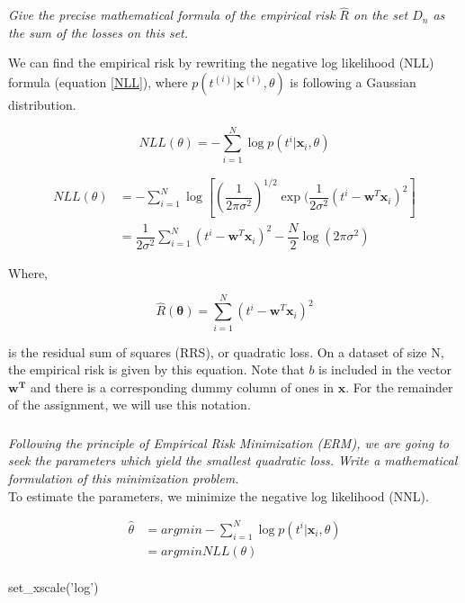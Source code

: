 \documentclass[reqno]{amsart}
\theoremstyle{definition}
\theoremstyle{remark}
\numberwithin{equation}{section}
\begin{document}
\textit{Give the precise mathematical formula of  the empirical risk $\hat{R}$ on the set $D_n$ as the sum of the losses on this set.\\}

We can find the empirical risk by rewriting the negative log likelihood (NLL) formula (equation \ref{NLL}), where $p(t^{(i)}|\mathbf{x}^{(i)}, \theta)$ is following a Gaussian distribution. 

\begin{equation}
\label{NLL}
    NLL(\theta) = -\sum_{i = 1}^{N}\log p(t^{i}|\mathbf{x}_{i}, \theta)
\end{equation}

\begin{align}
    NLL(\theta) &= -\sum_{i = 1}^{N}\log [(\dfrac{1}{2\pi\sigma^2})^{1/2}  \exp(\dfrac{1}{2\sigma^2}(t^{i}-\mathbf{w}^T\mathbf{x}_{i})^2] \\
    &= \dfrac{1}{2\sigma^2} \sum_{i=1}^{N}(t^{i}-\mathbf{w}^{T}\mathbf{x}_{i})^2 - \dfrac{N}{2} \log(2\pi\sigma^2) \label{NLL2}
\end{align}

Where,

\begin{equation}
    \hat{R}(\mathbf{\theta}) = \sum_{i = 1}^{N}(t^{i}-\mathbf{w}^{T}\mathbf{x}_{i})^2
\end{equation}

is the residual sum of squares (RRS), or quadratic loss. On a dataset of size N, the empirical risk is given by this equation. Note that $b$ is included in the vector $\mathbf{w^T}$ and there is a corresponding dummy column of ones in $\mathbf{x}$. For the remainder of the assignment, we will use this notation.

\subsubsection{}

\textit{Following the principle of Empirical Risk Minimization (ERM), we are
going to seek the parameters which yield the smallest quadratic loss.
Write a mathematical formulation of this minimization problem.}\\

To estimate the parameters, we minimize the negative log likelihood (NNL). 

\begin{align}
    \hat{\theta} &= argmin - \sum_{i=1}^{N}\log p(t^{i}|\mathbf{x}_i, \theta)\\
    &= argmin NLL(\theta)
\end{align}\\set_xscale('log')
\end{document}
